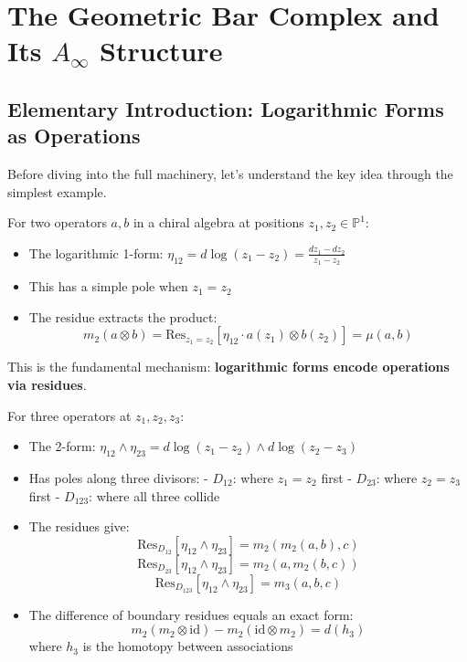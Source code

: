 
\section{The Geometric Bar Complex and Its $A_\infty$ Structure}

\subsection{Elementary Introduction: Logarithmic Forms as Operations}

Before diving into the full machinery, let's understand the key idea through the simplest example.

\begin{example}
For two operators $a, b$ in a chiral algebra at positions $z_1, z_2 \in \mathbb{P}^1$:
\begin{itemize}
\item The logarithmic 1-form: $\eta_{12} = d\log(z_1 - z_2) = \frac{dz_1 - dz_2}{z_1 - z_2}$
\item This has a simple pole when $z_1 = z_2$
\item The residue extracts the product:
$$m_2(a \otimes b) = \text{Res}_{z_1=z_2}\left[\eta_{12} \cdot a(z_1) \otimes b(z_2)\right] = \mu(a,b)$$
\end{itemize}
This is the fundamental mechanism: \textbf{logarithmic forms encode operations via residues}.
\end{example}

\begin{example}
For three operators at $z_1, z_2, z_3$:
\begin{itemize}
\item The 2-form: $\eta_{12} \wedge \eta_{23} = d\log(z_1-z_2) \wedge d\log(z_2-z_3)$
\item Has poles along three divisors:
  - $D_{12}$: where $z_1 = z_2$ first
  - $D_{23}$: where $z_2 = z_3$ first  
  - $D_{123}$: where all three collide
\item The residues give:
$$\text{Res}_{D_{12}}[\eta_{12} \wedge \eta_{23}] = m_2(m_2(a,b),c)$$
$$\text{Res}_{D_{23}}[\eta_{12} \wedge \eta_{23}] = m_2(a,m_2(b,c))$$
$$\text{Res}_{D_{123}}[\eta_{12} \wedge \eta_{23}] = m_3(a,b,c)$$
\item The difference of boundary residues equals an exact form:
$$m_2(m_2 \otimes \text{id}) - m_2(\text{id} \otimes m_2) = d(h_3)$$
where $h_3$ is the homotopy between associations
\end{itemize}
\end{example}

